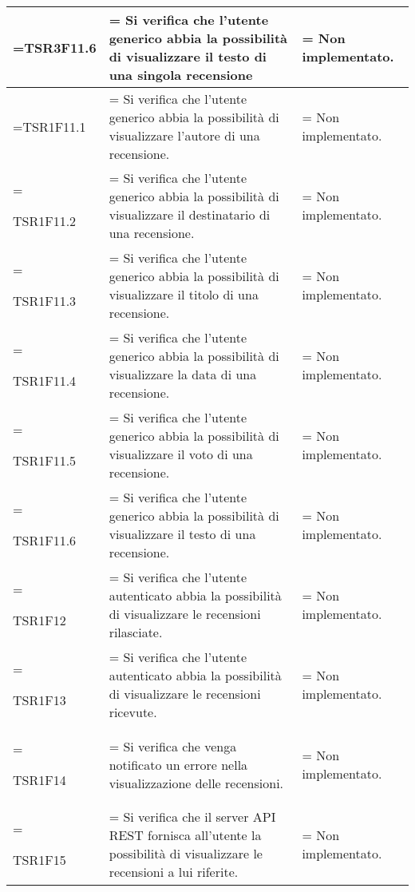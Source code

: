 \begin{xltabular}{\textwidth} {
        >{\hsize\linewidth=\hsize}X
        >{\hsize\linewidth=\hsize}X
        >{\hsize\linewidth=\hsize}X
    }
    TSR3F11.6 &
    Si verifica che l'utente generico abbia la possibilità di visualizzare il testo di una singola recensione  &
    Non implementato.
    \\ \hline
    

    
    
    TSR1F11.1 &
    Si verifica che l'utente generico abbia la possibilità di visualizzare l'autore di una recensione.  &
    Non implementato.
    \\ \hline
    
    TSR1F11.2 &
    Si verifica che l'utente generico abbia la possibilità di visualizzare il destinatario di una recensione.  &
    Non implementato.
    \\ \hline

    TSR1F11.3 &
    Si verifica che l'utente generico abbia la possibilità di visualizzare il titolo di una recensione.  &
    Non implementato.
    \\ \hline

    TSR1F11.4 &
    Si verifica che l'utente generico abbia la possibilità di visualizzare la data di una recensione.  &
    Non implementato.
    \\ \hline

    TSR1F11.5 &
    Si verifica che l'utente generico abbia la possibilità di visualizzare il voto di una recensione.  &
    Non implementato.
    \\ \hline

    TSR1F11.6 &
    Si verifica che l'utente generico abbia la possibilità di visualizzare il testo di una recensione.  &
    Non implementato.
    \\ \hline

    TSR1F12 &
    Si verifica che l'utente autenticato abbia la possibilità di visualizzare le recensioni rilasciate.  &
    Non implementato.
    \\ \hline

    TSR1F13 &
    Si verifica che l'utente autenticato abbia la possibilità di visualizzare le recensioni ricevute.  &
    Non implementato.
    \\ \hline

    TSR1F14 &
    Si verifica che venga notificato un errore nella visualizzazione delle recensioni.  &
    Non implementato.
    \\ \hline

    TSR1F15 &
    Si verifica che il server API REST fornisca all'utente la possibilità di visualizzare le recensioni a lui riferite. &
    Non implementato.
    \\ \hline


\end{xltabular}
